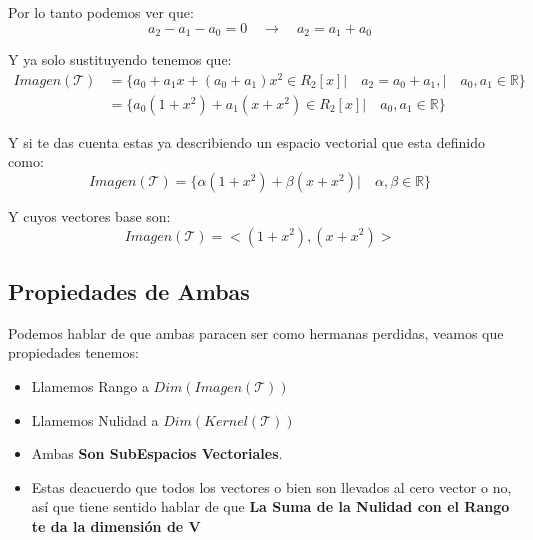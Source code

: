 \documentclass[12pt]{report}                                %
\begin{document}
            Por lo tanto podemos ver que:
            \begin{equation*}
                a_2-a_1-a_0 = 0
                \quad \to \quad
                a_2 = a_1 + a_0
            \end{equation*}

            Y ya solo sustituyendo tenemos que:
            \begin{equation*}
            \begin{split}
                Imagen(\mathscr{T}) 
                & = \{a_0+a_1x+(a_0+a_1)x^2 \in R_2[x] |\quad a_2 = a_0 + a_1, |\quad a_0, a_1 \in \mathbb{R}\}  \\
                & = \{a_0(1+x^2) +a_1(x+x^2) \in R_2[x] |\quad a_0, a_1 \in \mathbb{R}\}
            \end{split}
            \end{equation*}

            Y si te das cuenta estas ya describiendo un espacio vectorial que esta definido como:
            \begin{equation*}
                Imagen(\mathscr{T}) = \{\alpha(1+x^2) + \beta(x+x^2) |\quad \alpha, \beta \in \mathbb{R}\}
            \end{equation*}

            Y cuyos vectores base son:
            \begin{equation*}
                Imagen(\mathscr{T}) = <(1+x^2) , (x+x^2)>
            \end{equation*}

        \subsection{Propiedades de Ambas}
        Podemos hablar de que ambas paracen ser como hermanas perdidas,
        veamos que propiedades tenemos:

        \begin{itemize}
            \item Llamemos Rango a $Dim(Imagen(\mathscr{T}))$
            \item Llamemos Nulidad a $Dim(Kernel(\mathscr{T}))$
            \item Ambas \textbf{Son SubEspacios Vectoriales}.
            \item Estas deacuerdo que todos los vectores o bien son llevados al cero
            vector o no, así que tiene sentido hablar de que  \textbf{La Suma de la Nulidad
            con el Rango te da la dimensión de V}
        \end{itemize}
\end{document}
